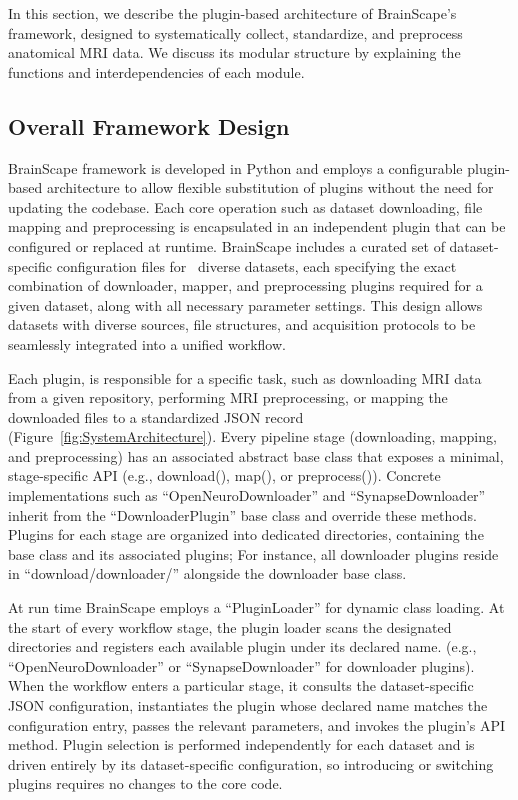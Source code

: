 In this section, we describe the plugin-based architecture of BrainScape's framework, designed to systematically 
collect, standardize, and preprocess anatomical MRI data. We discuss its modular structure by explaining 
the functions and interdependencies of each module.


\subsection{Overall Framework Design}

BrainScape framework is developed in Python and employs a configurable plugin-based architecture to allow flexible 
substitution of plugins without the need for updating the codebase. 
Each core operation such as dataset downloading, file mapping and preprocessing is encapsulated in an independent plugin that can be configured or replaced at runtime.
BrainScape includes a curated set of dataset-specific configuration files for \NumDatasets\ diverse datasets, 
each specifying the exact combination of downloader, mapper, and preprocessing plugins required for a given dataset, along with all necessary parameter settings.
This design allows datasets with diverse sources, file structures, and acquisition protocols to be seamlessly integrated into a unified workflow.

Each plugin, is responsible for a specific task, such as downloading MRI data from a given repository, 
performing MRI preprocessing, or mapping the downloaded files to a standardized JSON record (Figure~\ref{fig:SystemArchitecture}).
Every pipeline stage (downloading, mapping, and preprocessing) has an associated abstract base class that exposes a minimal, stage-specific API 
(e.g., download(), map(), or preprocess()).
Concrete implementations such as ``OpenNeuroDownloader'' and ``SynapseDownloader'' inherit from the ``DownloaderPlugin'' base class and override these methods. 
Plugins for each stage are organized into dedicated directories, containing the base class and its associated plugins; 
For instance, all downloader plugins reside in ``download/downloader/'' alongside the downloader base class.

At run time BrainScape employs a ``PluginLoader'' for dynamic class loading.
At the start of every workflow stage, the plugin loader scans the designated directories 
and registers each available plugin under its declared name.
(e.g., ``OpenNeuroDownloader'' or ``SynapseDownloader'' for downloader plugins).
When the workflow enters a particular stage, it consults the dataset-specific JSON configuration, 
instantiates the plugin whose declared name matches the configuration entry, passes the relevant parameters, 
and invokes the plugin's API method. 
Plugin selection is performed independently for each dataset 
and is driven entirely by its dataset-specific configuration, 
so introducing or switching plugins requires no changes to the core code.

